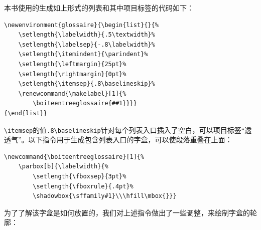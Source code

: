 本书使用的生成如上形式的列表和其中项目标签的代码如下：

\begin{dmd}
\begin{verbatim}
\newenvironment{glossaire}{\begin{list}{}{%
    \setlength{\labelwidth}{.5\textwidth}% 
    \setlength{\labelsep}{-.8\labelwidth}% 
    \setlength{\itemindent}{\parindent}% 
    \setlength{\leftmargin}{25pt}% 
    \setlength{\rightmargin}{0pt}%
    \setlength{\itemsep}{.8\baselineskip}% 
    \renewcommand{\makelabel}[1]{%
        \boiteentreeglossaire{##1}}}}
{\end{list}}
\end{verbatim}
\end{dmd}

\verb|\itemsep|的值\verb|.8\baselineskip|针对每个列表入口插入了空白，可以项目标签“透透气”。以下指令用于生成包含列表入口的字盒，可以使段落重叠在上面：

\begin{dmd}
\begin{verbatim}
\newcommand{\boiteentreeglossaire}[1]{% 
    \parbox[b]{\labelwidth}{%
        \setlength{\fboxsep}{3pt}% 
        \setlength{\fboxrule}{.4pt}% 
        \shadowbox{\sffamily#1}\\\hfill\mbox{}}}
\end{verbatim}
\end{dmd}

为了了解该字盒是如何放置的，我们对上述指令做出了一些调整，来绘制字盒的轮廓：

\renewcommand{\boiteentreeglossaire}[1]{%
    \parbox[b]{\labelwidth}{%
        \setlength{\fboxsep}{3pt}%
        \setlength{\fboxrule}{.4pt}%
        \shadowbox{\sffamily#1}\\\hfill\mbox{}}}

        \newenvironment{leglossaire}{%
        \begin{list}{}{%
            \setlength{\labelwidth}{.5\textwidth}%
            \setlength{\labelsep}{-.8\labelwidth}%
            \setlength{\itemindent}{\parindent}%
            \setlength{\leftmargin}{25pt}%
            \setlength{\rightmargin}{0pt}%
            \setlength{\itemsep}{.8\baselineskip}%
            \renewcommand{\makelabel}[1]{\boiteentreeglossaire{##1}}
          }
        }
      {\end{list}}

\newcommand{\fboiteentreeglossaire}[1]{%
      \setlength{\fboxsep}{-1pt}%
      \setlength{\fboxrule}{1pt}%
      \fbox{\parbox[b]{\labelwidth}{%
        \setlength{\fboxsep}{3pt}%
        \setlength{\fboxrule}{.4pt}%
        \shadowbox{\sffamily#1}\\\hfill\mbox{}%
      }}%
    }

